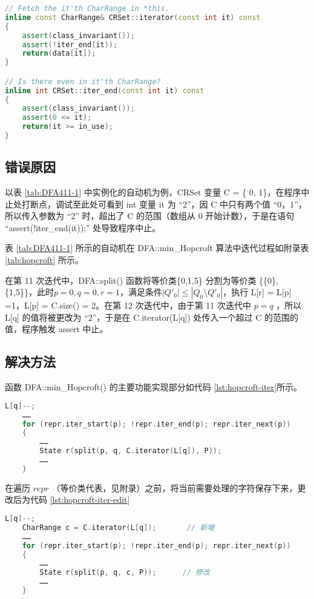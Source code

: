 \begin{lstlisting}[language=C++,label={lst:iterend},caption={ CRSet.h },firstnumber=142]
// Fetch the it'th CharRange in *this.
inline const CharRange& CRSet::iterator(const int it) const
{
    assert(class_invariant());
    assert(!iter_end(it));
    return(data[it]);
}

// Is there even in it'th CharRange?
inline int CRSet::iter_end(const int it) const
{
    assert(class_invariant());
    assert(0 <= it);
    return(it >= in_use);
}
\end{lstlisting}

\subsection{错误原因}

以表 \ref{tab:DFA411-1} 中实例化的自动机为例，CRSet 变量 C = \{ 0, 1\}，在程序中止处打断点，调试至此处可看到 int 变量 it 为 “2”，因 C 中只有两个值 “0，1”，所以传入参数为 “2” 时，超出了 C 的范围（数组从 0 开始计数），于是在语句 “assert(!iter\_end(it));” 处导致程序中止。

表 \ref{tab:DFA411-1} 所示的自动机在 DFA::min\_Hopcroft 算法中迭代过程如附录表 \ref{tab:hopcroft} 所示。

在第 11 次迭代中，DFA::split() 函数将等价类\{0,1,5\} 分割为等价类 \{\{0\},\{1,5\}\}，此时$p=0,q=0,r=1$，满足条件$|Q'_0| \leq | Q_0 \setminus Q'_0 |$，执行 L[r] = L[p] =1，L[p] = C.size() = 2。在第 12 次迭代中，由于第 11 次迭代中 $p=q$ ，所以 L[q] 的值将被更改为 “2”，于是在 C.iterator(L[q]) 处传入一个超过 C 的范围的值，程序触发 assert 中止。

\subsection{解决方法}

函数 DFA::min\_Hopcroft() 的主要功能实现部分如代码 \ref{lst:hopcroft-iter}所示。

\begin{lstlisting}[language=C++,label={lst:hopcroft-iter},caption={ min-hop.cpp },firstnumber=100]
    L[q]--;
    ……
    for (repr.iter_start(p); !repr.iter_end(p); repr.iter_next(p))
    {
        ……
        State r(split(p, q, C.iterator(L[q]), P));
        ……
    }
\end{lstlisting}

在遍历 $repr$ （等价类代表，见附录）之前，将当前需要处理的字符保存下来，更改后为代码 \ref{lst:hopcroft-iter-edit}

\begin{lstlisting}[language=C++,label={lst:hopcroft-iter-edit},caption={ min-hop.cpp },firstnumber=100]
    L[q]--;
    CharRange c = C.iterator(L[q]);       // 新增
    ……
    for (repr.iter_start(p); !repr.iter_end(p); repr.iter_next(p))
    {
        ……
        State r(split(p, q, c, P));      // 修改
        ……
    }
\end{lstlisting}

